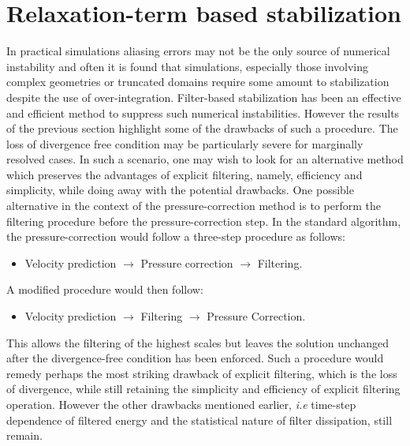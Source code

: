 \section{Relaxation-term based stabilization}

In practical simulations aliasing errors may not be the only source of numerical instability and often it is found that simulations, especially those involving complex geometries or truncated domains require some amount to stabilization despite the use of over-integration. Filter-based stabilization has been an effective and efficient method to suppress such numerical instabilities. However the results of the previous section highlight some of the drawbacks of such a procedure. The loss of divergence free condition may be particularly severe for marginally resolved cases. In such a scenario, one may wish to look for an alternative method which preserves the advantages of explicit filtering, namely, efficiency and simplicity, while doing away with the potential drawbacks. One possible alternative in the context of the pressure-correction method is to perform the filtering procedure before the pressure-correction step. In the standard algorithm, the pressure-correction would follow a three-step procedure as follows: 
\begin{itemize}
	\item Velocity prediction $\rightarrow$ Pressure correction $\rightarrow$ Filtering.
\end{itemize}
A modified procedure would then follow:
\begin{itemize}
	\item Velocity prediction $\rightarrow$ Filtering $\rightarrow$ Pressure Correction.
\end{itemize}
This allows the filtering of the highest scales but leaves the solution unchanged after the divergence-free condition has been enforced. Such a procedure would remedy perhaps the most striking drawback of explicit filtering, which is the loss of divergence, while still retaining the simplicity and efficiency of explicit filtering operation. However the other drawbacks mentioned earlier, \textit{i.e} time-step dependence of filtered energy and the statistical nature of filter dissipation, still remain.

